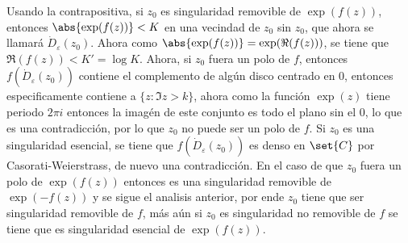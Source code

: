 \documentclass{homework}
\begin{document}
\begin{sol}
    Usando la contrapositiva, si \(z_0\) es singularidad removible de \(\exp(f(z))\), entonces \(\abs{\exp(f(z))}<K\) en una vecindad de \(z_0\) sin \(z_0\), que ahora se llamará \(\dot{D}_\varepsilon(z_0)\). Ahora como \(\abs{\exp(f(z))}=\exp(\Re(f(z)))\), se tiene que \(\Re(f(z))<K'=\log K\). Ahora, si \(z_0\) fuera un polo de \(f\), entonces \(f(\dot{D}_\varepsilon(z_0))\) contiene el complemento de algún disco centrado en \(0\), entonces especificamente contiene a \(\{z:\Im z>k\}\), ahora como la función \(\exp(z)\) tiene periodo \(2\pi i\) entonces la imagén de este conjunto es todo el plano sin el \(0\), lo que es una contradicción, por lo que \(z_0\) no puede ser un polo de \(f\). Si \(z_0\) es una singularidad esencial, se tiene que \(f(\dot{D}_\varepsilon(z_0))\) es denso en \(\set{C}\) por Casorati-Weierstrass, de nuevo una contradicción. En el caso de que \(z_0\) fuera un polo de \(\exp(f(z))\) entonces es una singularidad removible de \(\exp(-f(z))\) y se sigue el analisis anterior, por ende \(z_0\) tiene que ser singularidad removible de \(f\), más aún si \(z_0\) es singularidad no removible de \(f\) se tiene que es singularidad esencial de \(\exp(f(z))\).
\end{sol}
\end{document}
